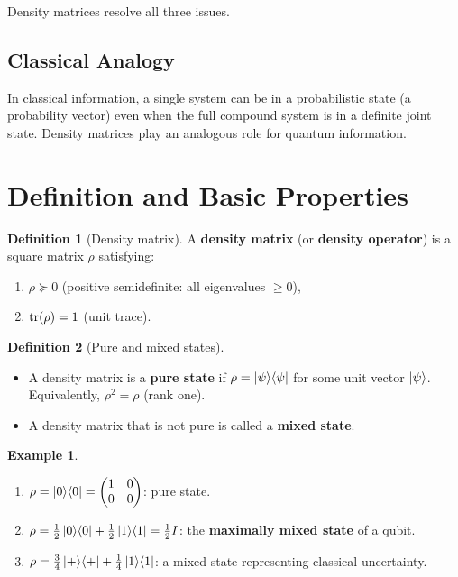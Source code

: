 \documentclass[11pt]{article}
\theoremstyle{definition}
\newtheorem{definition}{Definition}[section]
\newtheorem{example}{Example}[section]
\begin{document}
Density matrices resolve all three issues.

\subsection{Classical Analogy}

In classical information, a single system can be in a probabilistic state (a probability vector) even when the full compound system is in a definite joint state.  Density matrices play an analogous role for quantum information.

\section{Definition and Basic Properties}

\begin{definition}[Density matrix]
A \textbf{density matrix} (or \textbf{density operator}) is a square matrix $\rho$ satisfying:
\begin{enumerate}
    \item $\rho \succeq 0$ \quad (positive semidefinite: all eigenvalues $\ge 0$),
    \item $\tr(\rho)=1$ \quad (unit trace).
\end{enumerate}
\end{definition}

\begin{definition}[Pure and mixed states]
\begin{itemize}
    \item A density matrix is a \textbf{pure state} if $\rho=\ket{\psi}\!\bra{\psi}$ for some unit vector $\ket{\psi}$.  Equivalently, $\rho^2=\rho$ (rank one).
    \item A density matrix that is not pure is called a \textbf{mixed state}.
\end{itemize}
\end{definition}

\begin{example}\leavevmode
\begin{enumerate}
    \item $\rho=\ket{0}\!\bra{0}=\begin{pmatrix}1&0\\0&0\end{pmatrix}$: pure state.
    \item $\rho=\frac{1}{2}\ket{0}\!\bra{0}+\frac{1}{2}\ket{1}\!\bra{1}=\frac{1}{2}I$: the \textbf{maximally mixed state} of a qubit.
    \item $\rho=\frac{3}{4}\ket{+}\!\bra{+}+\frac{1}{4}\ket{1}\!\bra{1}$: a mixed state representing classical uncertainty.
\end{enumerate}
\end{example}
\end{document}
